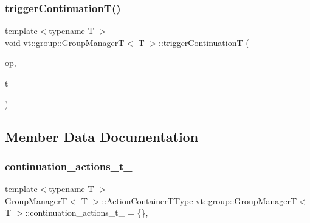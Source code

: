 \subsubsection{\texorpdfstring{trigger\+Continuation\+T()}{triggerContinuationT()}}
{\footnotesize\ttfamily template$<$typename T $>$ \\
void \hyperlink{structvt_1_1group_1_1_group_manager_t}{vt\+::group\+::\+Group\+ManagerT}$<$ T $>$\+::trigger\+ContinuationT (\begin{DoxyParamCaption}\item[{\hyperlink{namespacevt_1_1group_a73f2624ddeb535b39a08b6524f26b244}{Remote\+Operation\+I\+D\+Type} const \&}]{op,  }\item[{T}]{t }\end{DoxyParamCaption})\hspace{0.3cm}{\ttfamily [static]}}



\subsection{Member Data Documentation}
\mbox{\label{structvt_1_1group_1_1_group_manager_t_ace6828eddb4d595c12ea5c07047207d6}} 
\subsubsection{\texorpdfstring{continuation\+\_\+actions\+\_\+t\+\_\+}{continuation\_actions\_t\_}}
{\footnotesize\ttfamily template$<$typename T $>$ \\
\hyperlink{structvt_1_1group_1_1_group_manager_t}{Group\+ManagerT}$<$ T $>$\+::\hyperlink{structvt_1_1group_1_1_group_manager_t_adc0d6d680c4f8bdbb80cd90f84a5f7ee}{Action\+Container\+T\+Type} \hyperlink{structvt_1_1group_1_1_group_manager_t}{vt\+::group\+::\+Group\+ManagerT}$<$ T $>$\+::continuation\+\_\+actions\+\_\+t\+\_\+ = \{\}\hspace{0.3cm}{\ttfamily [static]}, {\ttfamily [private]}}

\mbox{\label{structvt_1_1group_1_1_group_manager_t_a294adcb4f4b41892733f29b9dea70f9e}} 
